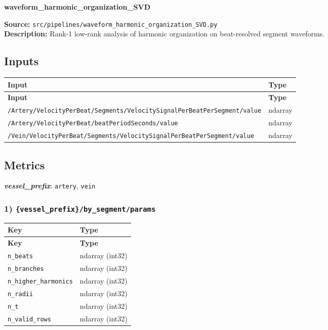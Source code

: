 \documentclass[11pt]{article}
\begin{document}
\begin{center}
\LARGE\textbf{waveform\_harmonic\_organization\_SVD}
\end{center}
\textbf{Source:} \texttt{src/\allowbreak{}pipelines/\allowbreak{}waveform\_\allowbreak{}harmonic\_\allowbreak{}organization\_\allowbreak{}SVD.py}\\
\textbf{Description:} Rank-1 low-rank analysis of harmonic organization on beat-resolved segment waveforms.

\subsection*{Inputs}
\begin{longtable}{|p{}|p{}|}
\hline
\textbf{Input} & \textbf{Type} \\ \hline
\endfirsthead
\hline
\textbf{Input} & \textbf{Type} \\ \hline
\endhead
{\scriptsize \texttt{/\allowbreak{}Artery/\allowbreak{}VelocityPerBeat/\allowbreak{}Segments/\allowbreak{}VelocitySignalPerBeatPerSegment/\allowbreak{}value}} & ndarray \\ \hline
{\scriptsize \texttt{/\allowbreak{}Artery/\allowbreak{}VelocityPerBeat/\allowbreak{}beatPeriodSeconds/\allowbreak{}value}} & ndarray \\ \hline
{\scriptsize \texttt{/\allowbreak{}Vein/\allowbreak{}VelocityPerBeat/\allowbreak{}Segments/\allowbreak{}VelocitySignalPerBeatPerSegment/\allowbreak{}value}} & ndarray \\ \hline
\end{longtable}

\subsection*{Metrics}
\textbf{\textit{vessel\_prefix}}: \texttt{artery}, \texttt{vein}
\subsubsection*{1) \texttt{\{vessel\_\allowbreak{}prefix\}/\allowbreak{}by\_\allowbreak{}segment/\allowbreak{}params}}
\begin{longtable}{|p{}|p{}|}
\hline
\textbf{Key} & \textbf{Type} \\ \hline
\endfirsthead
\hline
\textbf{Key} & \textbf{Type} \\ \hline
\endhead
\texttt{n\_\allowbreak{}beats} & ndarray (int32) \\ \hline
\texttt{n\_\allowbreak{}branches} & ndarray (int32) \\ \hline
\texttt{n\_\allowbreak{}higher\_\allowbreak{}harmonics} & ndarray (int32) \\ \hline
\texttt{n\_\allowbreak{}radii} & ndarray (int32) \\ \hline
\texttt{n\_\allowbreak{}t} & ndarray (int32) \\ \hline
\texttt{n\_\allowbreak{}valid\_\allowbreak{}rows} & ndarray (int32) \\ \hline
\end{longtable}
\end{document}
